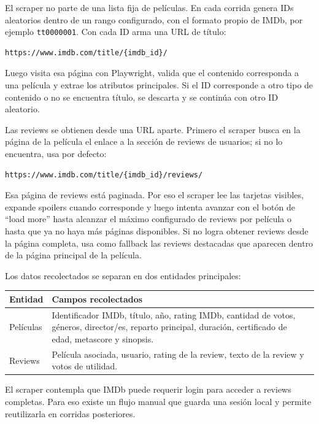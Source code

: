\documentclass[letterpaper,12pt]{article}
\begin{document}
El scraper no parte de una lista fija de películas. En cada corrida genera IDs aleatorios dentro de un rango configurado, con el formato propio de IMDb, por ejemplo \texttt{tt0000001}. Con cada ID arma una URL de título:

\begin{lstlisting}
https://www.imdb.com/title/{imdb_id}/
\end{lstlisting}

Luego visita esa página con Playwright, valida que el contenido corresponda a una película y extrae los atributos principales. Si el ID corresponde a otro tipo de contenido o no se encuentra título, se descarta y se continúa con otro ID aleatorio.

Las reviews se obtienen desde una URL aparte. Primero el scraper busca en la página de la película el enlace a la sección de reviews de usuarios; si no lo encuentra, usa por defecto:

\begin{lstlisting}
https://www.imdb.com/title/{imdb_id}/reviews/
\end{lstlisting}

Esa página de reviews está paginada. Por eso el scraper lee las tarjetas visibles, expande spoilers cuando corresponde y luego intenta avanzar con el botón de ``load more'' hasta alcanzar el máximo configurado de reviews por película o hasta que ya no haya más páginas disponibles. Si no logra obtener reviews desde la página completa, usa como fallback las reviews destacadas que aparecen dentro de la página principal de la película.

Los datos recolectados se separan en dos entidades principales:

\begin{longtable}{p{4cm}p{12cm}}
\toprule
\textbf{Entidad} & \textbf{Campos recolectados} \\
\midrule
Películas & Identificador IMDb, título, año, rating IMDb, cantidad de votos, géneros, director/es, reparto principal, duración, certificado de edad, metascore y sinopsis. \\
Reviews & Película asociada, usuario, rating de la review, texto de la review y votos de utilidad. \\
\bottomrule
\end{longtable}


El scraper contempla que IMDb puede requerir login para acceder a reviews completas. Para eso existe un flujo manual que guarda una sesión local y permite reutilizarla en corridas posteriores.
\end{document}

